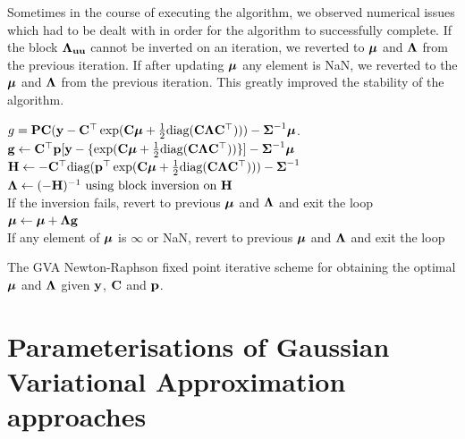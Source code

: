 Sometimes in the course of  executing the algorithm, we observed numerical
issues which had to be dealt with in order for the algorithm to successfully
complete. If the block ${\boldsymbol \Lambda}_{{\bf u} {\bf u}}$ cannot be inverted on an iteration,
we reverted to ${\boldsymbol \mu}$ and ${\boldsymbol \Lambda}$ from the previous iteration. If after
updating ${\boldsymbol \mu}$ any element is NaN, we reverted to the ${\boldsymbol \mu}$ and ${\boldsymbol \Lambda}$
from the previous iteration. This greatly improved the stability of the
algorithm.

\begin{algorithm}
	\begin{algorithmic}
		\REQUIRE $g = {\bf P} {\bf C} ({\bf y} - {\bf C}^\top \exp({\bf C} {\boldsymbol \mu}
                      + \tfrac{1}{2} \text{diag}{({\bf C}{\boldsymbol\Lambda}{\bf C}^\top)})) 
                      - {\boldsymbol \Sigma}^{-1} {\boldsymbol \mu}$.
			\STATE ${\bf g} \leftarrow {\bf C}^\top {\bf p} [{\bf y} - \{ \exp({\bf C} {\boldsymbol \mu}
                    + \tfrac{1}{2} \text{diag}({\bf C} {\boldsymbol \Lambda} {\bf C}^\top)) \}] 
                    - {\boldsymbol \Sigma}^{-1} {\boldsymbol \mu}$ \\
			\STATE ${\bf H} \leftarrow
                    -{\bf C}^\top \text{diag}({\bf p}^\top \exp({\bf C} {\boldsymbol \mu} 
                    + \tfrac{1}{2} \text{diag}({\bf C} {\boldsymbol \Lambda} {\bf C}^\top))) - {\boldsymbol \Sigma}^{-1}$ \\
			\STATE ${\boldsymbol \Lambda} \leftarrow (-{\bf H})^{-1}
                    \text{ using block inversion on } {\bf H}$ \\
			If the inversion fails, revert to previous ${\boldsymbol \mu}$ and ${\boldsymbol \Lambda}$
            and exit the loop \\
			\STATE ${\boldsymbol \mu} \leftarrow {\boldsymbol\mu} + {\boldsymbol \Lambda} {\bf g}$ \\
			If any element of ${\boldsymbol \mu}$ is $\infty$ or NaN, revert to previous 
            ${\boldsymbol \mu}$ and ${\boldsymbol \Lambda}$ and exit the loop
		\ENDWHILE
	\end{algorithmic}
	\caption{The GVA Newton-Raphson fixed point iterative scheme for obtaining the optimal ${\boldsymbol \mu}$ and ${\boldsymbol \Lambda}$
		given ${\bf y}$, ${\bf C}$ and ${\bf p}$.}
	\label{alg:algorithm_nr}
\end{algorithm}

\section{Parameterisations of Gaussian Variational Approximation approaches}
\label{sec:param}
